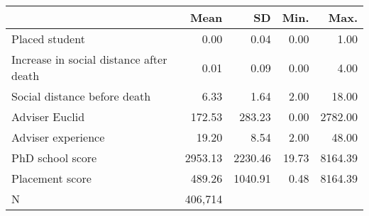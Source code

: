 {
\def\sym#1{\ifmmode^{#1}\else\(^{#1}\)\fi}
\begin{tabular}{l*{1}{rrrr}}
\toprule
                    &        Mean&          SD&        Min.&        Max.\\
\midrule
Placed student      &        0.00&        0.04&        0.00&        1.00\\
Increase in social distance after death&        0.01&        0.09&        0.00&        4.00\\
Social distance before death&        6.33&        1.64&        2.00&       18.00\\
Adviser Euclid      &      172.53&      283.23&        0.00&     2782.00\\
Adviser experience  &       19.20&        8.54&        2.00&       48.00\\
PhD school score    &     2953.13&     2230.46&       19.73&     8164.39\\
Placement score     &      489.26&     1040.91&        0.48&     8164.39\\
\midrule
N                   &     406,714&            &            &            \\
\bottomrule
\end{tabular}
}
